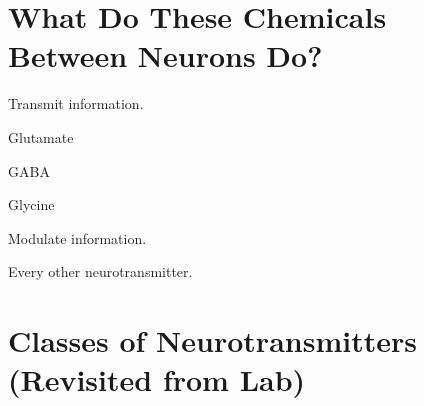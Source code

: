 \section{What Do These Chemicals Between Neurons Do?}

\begin{coloredlist}
    \item Transmit information.
    \begin{coloredlist}
        \item Glutamate
        \item GABA
        \item Glycine
    \end{coloredlist}
    \item Modulate information.
    \begin{coloredlist}
        \item Every other neurotransmitter.
    \end{coloredlist}
\end{coloredlist}

\section{Classes of Neurotransmitters (Revisited from Lab)}

